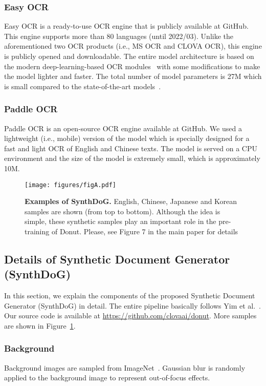 \documentclass[runningheads]{llncs}
\newcommand\ours{{{\mbox{Donut}}}\xspace}
\begin{document}
\subsubsection{Easy OCR}
Easy OCR is a ready-to-use OCR engine that is publicly available at GitHub. This engine supports more than 80 languages (until 2022/03). Unlike the aforementioned two OCR products (i.e., MS OCR and CLOVA OCR),
this engine is publicly opened and downloadable.
The entire model architecture is based on the modern deep-learning-based OCR modules~\cite{baek2019craft,baek2019wrong} with some modifications to make the model lighter and faster. The total number of model parameters is 27M which is small compared to the state-of-the-art models~\cite{baek2019craft,baek2019wrong}.

\subsubsection{Paddle OCR}
Paddle OCR is an open-source OCR engine available at GitHub. We used a lightweight (i.e., mobile) version of the model which is specially designed for a fast and light OCR of English and Chinese texts. The model is served on a CPU environment and the size of the model is extremely small, which is approximately 10M.


\begin{figure}[t!]
    \centering
    \texttt{[image: figures/figA.pdf]}
    \caption{{\bf Examples of SynthDoG.} English, Chinese, Japanese and Korean samples are shown (from top to bottom). Although the idea is simple, these synthetic samples play an important role in the pre-training of \ours. Please, see Figure 7 in the main paper for details}
    \label{fig:more_synthdog}
\end{figure}


\subsection{Details of Synthetic Document Generator (SynthDoG)}\label{sec:detail_of_synthdog}
In this section, we explain the components of the proposed Synthetic Document Generator (SynthDoG) in detail. 
The entire pipeline basically follows Yim et al.~\cite{synthtiger}.
Our source code is available at \url{https://github.com/clovaai/donut}.
More samples are shown in Figure~\ref{fig:more_synthdog}.

\subsubsection{Background}
Background images are sampled from ImageNet~\cite{deng2009imagenet}.
Gaussian blur is randomly applied to the background image to represent out-of-focus effects.
\end{document}
